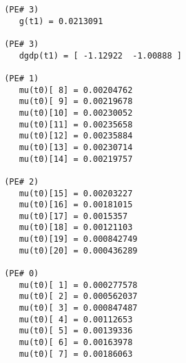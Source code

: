 \begin{verbatim}
 (PE# 3)
    g(t1) = 0.0213091

 (PE# 3)
    dgdp(t1) = [ -1.12922  -1.00888 ]

 (PE# 1)
    mu(t0)[ 8] = 0.00204762
    mu(t0)[ 9] = 0.00219678
    mu(t0)[10] = 0.00230052
    mu(t0)[11] = 0.00235658
    mu(t0)[12] = 0.00235884
    mu(t0)[13] = 0.00230714
    mu(t0)[14] = 0.00219757

 (PE# 2)
    mu(t0)[15] = 0.00203227
    mu(t0)[16] = 0.00181015
    mu(t0)[17] = 0.0015357
    mu(t0)[18] = 0.00121103
    mu(t0)[19] = 0.000842749
    mu(t0)[20] = 0.000436289

 (PE# 0)
    mu(t0)[ 1] = 0.000277578
    mu(t0)[ 2] = 0.000562037
    mu(t0)[ 3] = 0.000847487
    mu(t0)[ 4] = 0.00112653
    mu(t0)[ 5] = 0.00139336
    mu(t0)[ 6] = 0.00163978
    mu(t0)[ 7] = 0.00186063
\end{verbatim}